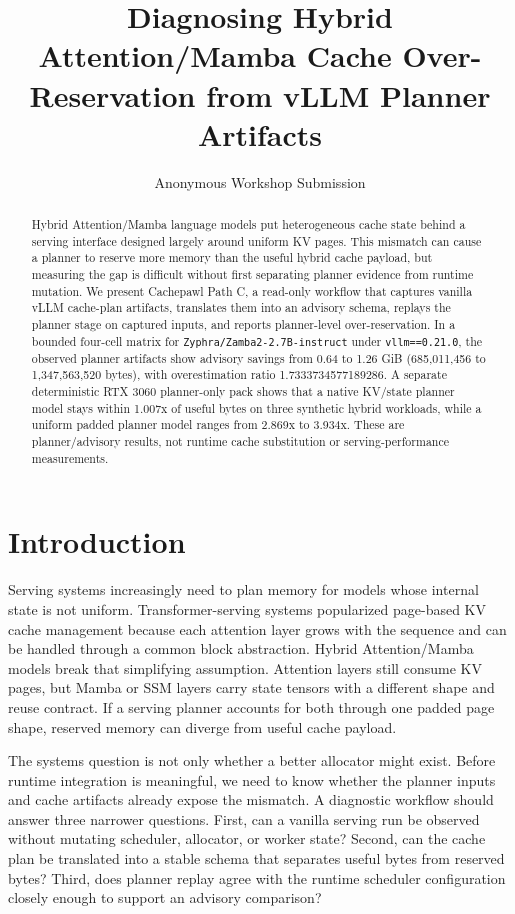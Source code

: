 \documentclass[10pt,twocolumn]{article}
\title{Diagnosing Hybrid Attention/Mamba Cache Over-Reservation from vLLM Planner Artifacts}
\author{Anonymous Workshop Submission}
\date{}
\newcommand{\tool}{Cachepawl}
\newcommand{\pathc}{Path C}
\begin{document}
\maketitle

\begin{abstract}
Hybrid Attention/Mamba language models put heterogeneous cache state behind a
serving interface designed largely around uniform KV pages. This mismatch can
cause a planner to reserve more memory than the useful hybrid cache payload,
but measuring the gap is difficult without first separating planner evidence
from runtime mutation. We present \tool{} \pathc, a read-only workflow that
captures vanilla vLLM cache-plan artifacts, translates them into an advisory
schema, replays the planner stage on captured inputs, and reports
planner-level over-reservation. In a bounded four-cell matrix for
\texttt{Zyphra/Zamba2-2.7B-instruct} under \texttt{vllm==0.21.0}, the observed
planner artifacts show advisory savings from 0.64 to 1.26 GiB
(685,011,456 to 1,347,563,520 bytes), with overestimation ratio
1.7333734577189286. A separate deterministic RTX 3060 planner-only pack shows
that a native KV/state planner model stays within 1.007x of useful bytes on
three synthetic hybrid workloads, while a uniform padded planner model ranges
from 2.869x to 3.934x. These are planner/advisory results, not runtime cache
substitution or serving-performance measurements.
\end{abstract}

\section{Introduction}

Serving systems increasingly need to plan memory for models whose internal
state is not uniform. Transformer-serving systems popularized page-based KV
cache management because each attention layer grows with the sequence and can
be handled through a common block abstraction. Hybrid Attention/Mamba models
break that simplifying assumption. Attention layers still consume KV pages,
but Mamba or SSM layers carry state tensors with a different shape and reuse
contract. If a serving planner accounts for both through one padded page shape,
reserved memory can diverge from useful cache payload.

The systems question is not only whether a better allocator might exist. Before
runtime integration is meaningful, we need to know whether the planner inputs
and cache artifacts already expose the mismatch. A diagnostic workflow should
answer three narrower questions. First, can a vanilla serving run be observed
without mutating scheduler, allocator, or worker state? Second, can the cache
plan be translated into a stable schema that separates useful bytes from
reserved bytes? Third, does planner replay agree with the runtime scheduler
configuration closely enough to support an advisory comparison?
\end{document}
